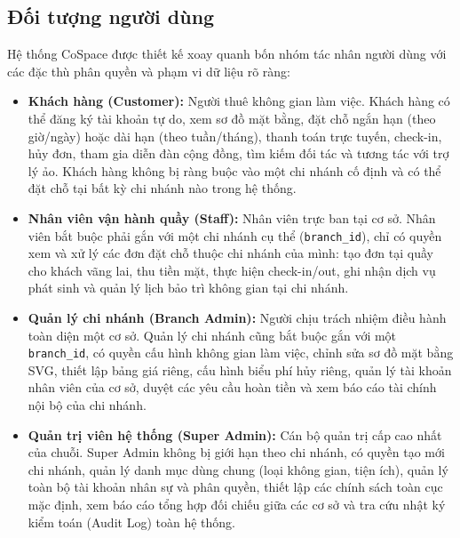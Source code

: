 \subsection{Đối tượng người dùng}
Hệ thống CoSpace được thiết kế xoay quanh bốn nhóm tác nhân người dùng với các đặc thù phân quyền và phạm vi dữ liệu rõ ràng:
\begin{itemize}
    \item \textbf{Khách hàng (Customer):} Người thuê không gian làm việc. Khách hàng có thể đăng ký tài khoản tự do, xem sơ đồ mặt bằng, đặt chỗ ngắn hạn (theo giờ/ngày) hoặc dài hạn (theo tuần/tháng), thanh toán trực tuyến, check-in, hủy đơn, tham gia diễn đàn cộng đồng, tìm kiếm đối tác và tương tác với trợ lý ảo. Khách hàng không bị ràng buộc vào một chi nhánh cố định và có thể đặt chỗ tại bất kỳ chi nhánh nào trong hệ thống.
    \item \textbf{Nhân viên vận hành quầy (Staff):} Nhân viên trực ban tại cơ sở. Nhân viên bắt buộc phải gắn với một chi nhánh cụ thể (\texttt{branch\_id}), chỉ có quyền xem và xử lý các đơn đặt chỗ thuộc chi nhánh của mình: tạo đơn tại quầy cho khách vãng lai, thu tiền mặt, thực hiện check-in/out, ghi nhận dịch vụ phát sinh và quản lý lịch bảo trì không gian tại chi nhánh.
    \item \textbf{Quản lý chi nhánh (Branch Admin):} Người chịu trách nhiệm điều hành toàn diện một cơ sở. Quản lý chi nhánh cũng bắt buộc gắn với một \texttt{branch\_id}, có quyền cấu hình không gian làm việc, chỉnh sửa sơ đồ mặt bằng SVG, thiết lập bảng giá riêng, cấu hình biểu phí hủy riêng, quản lý tài khoản nhân viên của cơ sở, duyệt các yêu cầu hoàn tiền và xem báo cáo tài chính nội bộ của chi nhánh.
    \item \textbf{Quản trị viên hệ thống (Super Admin):} Cán bộ quản trị cấp cao nhất của chuỗi. Super Admin không bị giới hạn theo chi nhánh, có quyền tạo mới chi nhánh, quản lý danh mục dùng chung (loại không gian, tiện ích), quản lý toàn bộ tài khoản nhân sự và phân quyền, thiết lập các chính sách toàn cục mặc định, xem báo cáo tổng hợp đối chiếu giữa các cơ sở và tra cứu nhật ký kiểm toán (Audit Log) toàn hệ thống.
\end{itemize}

